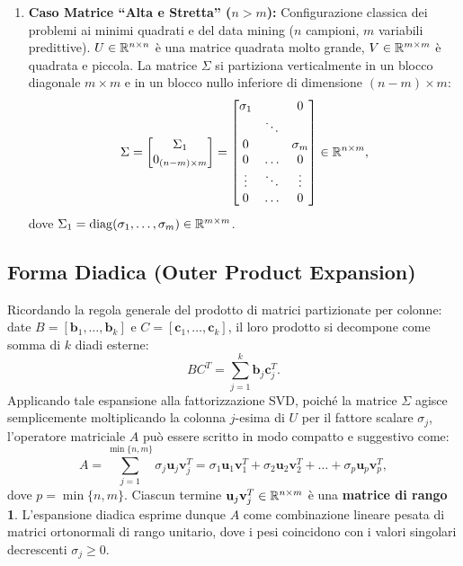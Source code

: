 \begin{enumerate}
    \item \textbf{Caso Matrice ``Alta e Stretta'' ($n > m$):}
    Configurazione classica dei problemi ai minimi quadrati e del data mining ($n$ campioni, $m$ variabili predittive). $U \in \mathbb{R}^{n \times n}$ \`e una matrice quadrata molto grande, $V \in \mathbb{R}^{m \times m}$ \`e quadrata e piccola. La matrice $\Sigma$ si partiziona verticalmente in un blocco diagonale $m \times m$ e in un blocco nullo inferiore di dimensione $(n - m) \times m$:
    \begin{equation}
        \Sigma = \begin{bmatrix} \Sigma_1 \\ 0_{(n - m) \times m} \end{bmatrix} = \begin{bmatrix}
            \sigma_1 & & 0 \\
            & \ddots & \\
            0 & & \sigma_m \\
            0 & \dots & 0 \\
            \vdots & \ddots & \vdots \\
            0 & \dots & 0
        \end{bmatrix} \in \mathbb{R}^{n \times m},
    \end{equation}
    dove $\Sigma_1 = \operatorname{diag}(\sigma_1, \dots, \sigma_m) \in \mathbb{R}^{m \times m}$.
\end{enumerate}

\subsection{Forma Diadica (Outer Product Expansion)}

Ricordando la regola generale del prodotto di matrici partizionate per colonne: date $B = [\mathbf{b}_1, \dots, \mathbf{b}_k]$ e $C = [\mathbf{c}_1, \dots, \mathbf{c}_k]$, il loro prodotto si decompone come somma di $k$ diadi esterne:
\begin{equation}
    B C^T = \sum_{j=1}^k \mathbf{b}_j \mathbf{c}_j^T.
\end{equation}
Applicando tale espansione alla fattorizzazione SVD, poich\'e la matrice $\Sigma$ agisce semplicemente moltiplicando la colonna $j$-esima di $U$ per il fattore scalare $\sigma_j$, l'operatore matriciale $A$ pu\`o essere scritto in modo compatto e suggestivo come:
\begin{equation}
\label{eq:svd-forma-diadica}
    A = \sum_{j=1}^{\min\{n, m\}} \sigma_j \mathbf{u}_j \mathbf{v}_j^T = \sigma_1 \mathbf{u}_1 \mathbf{v}_1^T + \sigma_2 \mathbf{u}_2 \mathbf{v}_2^T + \dots + \sigma_p \mathbf{u}_p \mathbf{v}_p^T,
\end{equation}
dove $p = \min\{n, m\}$. Ciascun termine $\mathbf{u}_j \mathbf{v}_j^T \in \mathbb{R}^{n \times m}$ \`e una \textbf{matrice di rango 1}. L'espansione diadica esprime dunque $A$ come combinazione lineare pesata di matrici ortonormali di rango unitario, dove i pesi coincidono con i valori singolari decrescenti $\sigma_j \ge 0$.

